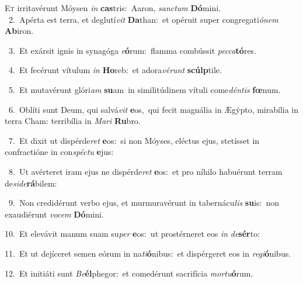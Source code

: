\lettrine{\initial\textcolor{\initialcolor}{E}}{t} irritavérunt Móysen \textit{in} \textbf{cas}\-tris:~\star Aaron, \textit{sanc}\-\textit{tum} \textbf{Dó}\-mini.\\
{\numbfont\textcolor{\numbcolor}{~2.}}~Apérta est terra, et deglutí\textit{vit} \textbf{Da}\-than:~\star et opéruit super congregati\-\textit{ó}\-\textit{nem} \textbf{Ab}\-iron.\par
{\numbfont\textcolor{\numbcolor}{~3.}}~Et exársit ignis in synagóga \textit{e}\-\textbf{ó}rum:~\star flamma combússit \textit{pec}\-\textit{ca}\textbf{tó}res.\par
{\numbfont\textcolor{\numbcolor}{~4.}}~Et fecérunt vítulum \textit{in} \textbf{Ho}\-reb:~\star et adora\-\textit{vé}\-\textit{runt} \textbf{scúlp}\-tile.\par
{\numbfont\textcolor{\numbcolor}{~5.}}~Et mutavérunt glóri\textit{am} \textbf{su}\-am~\star in similitúdinem vítuli come\-\textit{dén}\-\textit{tis} \textbf{fœ}\-num.\par
{\numbfont\textcolor{\numbcolor}{~6.}}~Oblíti sunt Deum, qui salvá\textit{vit} \textbf{e}\-os,~\star qui fecit magnália in Ægýpto, mirabília in terra Cham: terribília in \textit{Ma}\-\textit{ri} \textbf{Ru}\-bro.\par
{\numbfont\textcolor{\numbcolor}{~7.}}~Et dixit ut dispérde\textit{ret} \textbf{e}\-os:~\star si non Móyses, eléctus ejus, stetísset in confractióne in con\-\textit{spéc}\-\textit{tu} \textbf{e}\-jus:\par
{\numbfont\textcolor{\numbcolor}{~8.}}~Ut avérteret iram ejus ne dispérde\textit{ret} \textbf{e}\-os:~\star et pro níhilo habuérunt terram de\-\textit{si}\-\textit{de}\textbf{rá}bilem:\par
{\numbfont\textcolor{\numbcolor}{~9.}}~Non credidérunt verbo ejus, et murmuravérunt in tabernácu\textit{lis} \textbf{su}\-is:~\star non exaudiérunt \textit{vo}\-\textit{cem} \textbf{Dó}\-mini.\par
{\numbfont\textcolor{\numbcolor}{10.}}~Et elevávit manum suam su\textit{per} \textbf{e}\-os:~\star ut prostérneret eos \textit{in} \textit{de}\-\textbf{sér}to:\par
{\numbfont\textcolor{\numbcolor}{11.}}~Et ut dejíceret semen eórum in na\-\textit{ti}\-\textbf{ó}nibus:~\star et dispérgeret eos in \textit{re}\-\textit{gi}\textbf{ó}nibus.\par
{\numbfont\textcolor{\numbcolor}{12.}}~Et initiáti sunt \textit{Be}\-\textbf{él}phegor:~\star et comedérunt sacrifícia \textit{mor}\-\textit{tu}\textbf{ó}rum.\par
